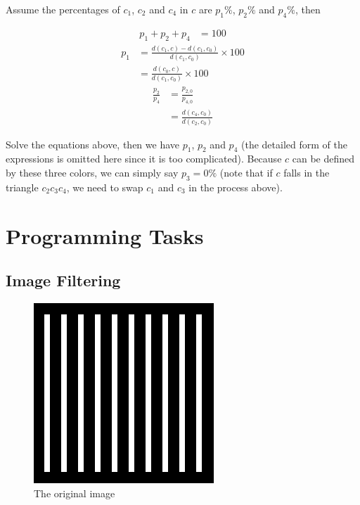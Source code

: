 \documentclass{article}
\begin{document}
Assume the percentages of $c_1$, $c_2$ and $c_4$ in $c$ are $p_1\%$, $p_2\%$ and $p_4\%$, then

\begin{align*}
p_1 + p_2 + p_4 &= 100
\end{align*}
\begin{align*}
p_1 &= \frac{d(c_1, c) - d(c_1, c_0)}{d(c_1, c_0)} \times 100\\
&=  \frac{d(c_0, c)}{d(c_1, c_0)} \times 100
\end{align*}
\begin{align*}
\frac{p_2}{p_4} & = \frac{p_{2, 0}}{p_{4, 0}}\\
&=  \frac{d(c_4, c_0)}{d(c_2, c_0)}
\end{align*}

Solve the equations above, then we have $p_1$, $p_2$ and $p_4$ (the detailed form of the expressions is omitted here since it is too complicated). Because $c$ can be defined by these three colors, we can simply say $p_3 = 0 \%$ (note that if $c$ falls in the triangle $c_2c_3c_4$, we need to swap $c_1$ and $c_3$ in the process above).

\section{Programming Tasks}
\subsection{Image Filtering}

\begin{figure}[H]
	\centering
	\includegraphics[width=192pt]{../img/task_1.png}
	\caption{The original image}
\end{figure}
\end{document}
